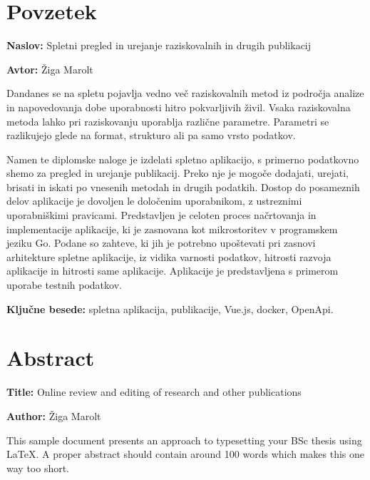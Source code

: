 \documentclass[a4paper, 12pt]{book}
\newcommand{\ttitle}{Spletni pregled in urejanje raziskovalnih in drugih publikacij}
\newcommand{\ttitleEn}{Online review and editing of research and other publications}
\newcommand{\tauthor}{Žiga Marolt}
\newcommand{\tkeywords}{spletna aplikacija, publikacije, Vue.js, docker, OpenApi}
\newcommand{\clearemptydoublepage}{\newpage{\pagestyle{empty}\cleardoublepage}}
\begin{document}
\clearemptydoublepage

\chapter*{Povzetek}

\noindent\textbf{Naslov:} \ttitle
\bigskip

\noindent\textbf{Avtor:} \tauthor
\bigskip

\noindent Dandanes se na spletu pojavlja vedno več raziskovalnih metod iz področja analize in napovedovanja dobe uporabnosti hitro pokvarljivih živil. Vsaka raziskovalna metoda lahko pri raziskovanju uporablja različne parametre. Parametri se razlikujejo glede na format, strukturo ali pa samo vrsto podatkov. 

Namen te diplomske naloge je izdelati spletno aplikacijo, s primerno podatkovno shemo za pregled in urejanje publikacij. Preko nje je mogoče dodajati, urejati, brisati in iskati po vnesenih metodah in drugih podatkih. Dostop do posameznih delov aplikacije je dovoljen le določenim uporabnikom, z ustreznimi uporabniškimi pravicami. Predstavljen je celoten proces načrtovanja in implementacije aplikacije, ki je zasnovana kot mikrostoritev v programskem jeziku Go. Podane so zahteve, ki jih je potrebno upoštevati pri zasnovi arhitekture spletne aplikacije, iz vidika varnosti podatkov, hitrosti razvoja aplikacije in hitrosti same aplikacije. Aplikacije je predstavljena s primerom uporabe testnih podatkov.

\bigskip

\noindent\textbf{Ključne besede:} \tkeywords.
\clearemptydoublepage

\chapter*{Abstract}

\noindent\textbf{Title:} \ttitleEn
\bigskip

\noindent\textbf{Author:} \tauthor
\bigskip

\noindent This sample document presents an approach to typesetting your BSc thesis using \LaTeX. 
A proper abstract should contain around 100 words which makes this one way too short.
\bigskip
\end{document}
